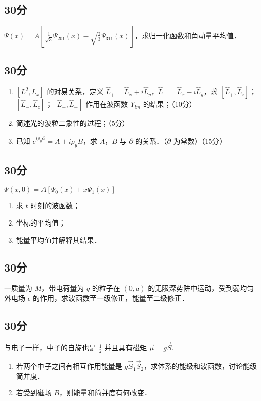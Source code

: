 
\subsection{30分}
$\varPsi (x)=A[\frac{1}{\sqrt{3}}\varPsi_{201}(x)-\sqrt{\frac{2}{3}}\varPsi_{311}(x)]$，求归一化函数和角动量平均值．
\subsection{30分}
\begin{enumerate}
\item $[L^{2},L_{x}]$ 的对易关系，定义 $\hat{L}_{+}=\hat{L}_{x}+i\hat{L}_{y}$，$\hat{L}_{-}=\hat{L}_{x}-i\hat{L}_{y}$，求 $[\hat{L}_{+},\hat{L}_{z}]$；$[\hat{L}_{-},\hat{L}_{z}]$；$[\hat{L}_{+},\hat{L}_{-}]$ 作用在波函数 $Y_{lm}$ 的结果；（10分）
\item 简述光的波粒二象性的过程；（5分）
\item 已知 $e^{i\rho_{y}\partial}=A+i\rho_{y}B$，求 $A$，$B$ 与 $\partial$ 的关系．（$\partial$ 为常数）（15分）
\end{enumerate}
\subsection{30分}
$\varPsi (x,0)=A[\varPsi_{0}(x)+x\varPsi_{1}(x)]$
\begin{enumerate}
\item 求 $t$ 时刻的波函数；
\item 坐标的平均值；
\item 能量平均值并解释其结果．
\end{enumerate}
\subsection{30分}
一质量为 $M$，带电荷量为 $q$ 的粒子在 $(0,a)$ 的无限深势阱中运动，受到弱均匀外电场 $\epsilon$ 的作用，求波函数至一级修正，能量至二级修正．
\subsection{30分}
与电子一样，中子的自旋也是 $\frac{1}{2}$ 并且具有磁矩 $\vec{\mu}=g\vec{S}$.
\begin{enumerate}
\item 若两个中子之间有相互作用能量是 $g\vec{S}_{1}\vec{S}_{2}$，求体系的能级和波函数，讨论能级简并度．
\item 若受到磁场 $B$，则能量和简并度有何改变．
\end{enumerate}